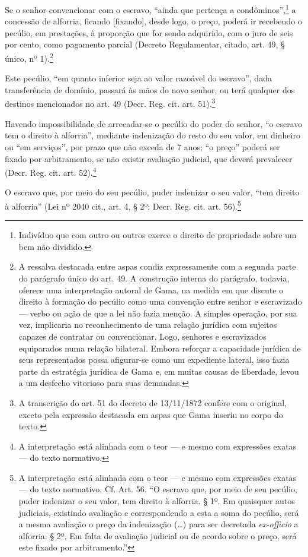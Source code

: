 {Se o senhor convencionar com o escravo, ``ainda que pertença a
condôminos'',\footnote{Indivíduo que com outro ou outros exerce o
  direito de propriedade sobre um bem não dividido.} a concessão de
alforria, ficando {[}fixando{]}, desde logo, o preço, poderá ir
recebendo o pecúlio, em prestações, à proporção que for sendo adquirido,
com o juro de seis por cento, como pagamento parcial (Decreto
Regulamentar, citado, art. 49, § único, nº
1).\footnote{A ressalva destacada entre aspas condiz expressamente com
  a segunda parte do parágrafo único do art. 49. A construção interna do
  parágrafo, todavia, oferece uma interpretação autoral de Gama,
  na medida em que discute o direito à formação do pecúlio como uma
  convenção entre senhor e escravizado --- verbo ou ação de que a lei não
  fazia menção. A simples operação, por sua vez, implicaria no
  reconhecimento de uma relação jurídica com sujeitos capazes de
  contratar ou convencionar. Logo, senhores e escravizados equiparados
  numa relação bilateral. Embora reforçar a capacidade jurídica de seus
  representados possa afigurar-se como um expediente lateral, isso fazia
  parte da estratégia jurídica de Gama e, em muitas causas de liberdade,
  levou a um desfecho vitorioso para suas demandas.}

Este pecúlio, ``em quanto inferior seja ao valor razoável do escravo'',
dada transferência de domínio, passará às mãos do novo senhor, ou terá
qualquer dos destinos mencionados no art. 49 (Decr. Reg. cit. art.
51).\footnote{A transcrição do art. 51 do decreto de 13/11/1872
  confere com o original, exceto pela expressão destacada em aspas que
  Gama inseriu no corpo do texto.}

Havendo impossibilidade de arrecadar-se o pecúlio do poder do senhor, ``o
escravo tem o direito à alforria'', mediante indenização do resto do seu
valor, em dinheiro ou ``em serviços'', por prazo que não exceda de 7 anos;
``o preço'' poderá ser fixado por arbitramento, se não existir avaliação
judicial, que deverá prevalecer (Decr. Reg. cit. art. 52).\footnote{A
  interpretação está alinhada com o teor --- e mesmo com expressões exatas ---
  do texto normativo.}

O escravo que, por meio do seu pecúlio, puder indenizar o seu valor,
``tem direito à alforria'' (Lei nº 2040 cit., art. 4, § 2º; Decr. Reg.
cit. art. 56).\footnote{A interpretação está alinhada com o teor --- e %
  mesmo com expressões exatas --- do texto normativo. Cf. Art. 56. ``O escravo
  que, por meio de seu pecúlio, puder indenizar o seu valor, tem direito
  à alforria. § 1º. Em quaisquer autos judiciais, existindo avaliação e
  correspondendo a esta a soma do pecúlio, será a mesma avaliação o
  preço da indenização (\ldots{}) para ser decretada \emph{ex-officio} a
  alforria. § 2º. Em falta de avaliação judicial ou de acordo sobre o
  preço, será este fixado por arbitramento.''}

}
